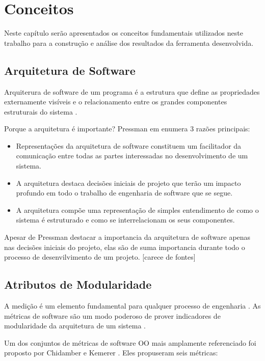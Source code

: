 \chapter{Conceitos} \label{ch:conceitos}

Neste capítulo serão apresentados os conceitos fundamentais utilizados neste
trabalho para a construção e análise dos resultados da ferramenta desenvolvida.

\section{Arquitetura de Software}

Arquiterura de software de um programa é a estrutura que define as propriedades
externamente visíveis e o relacionamento entre os grandes componentes
estruturais do sistema \cite{engenhariaDeSoftwarePressman}.

Porque a arquitetura é importante? Pressman em
\cite{engenhariaDeSoftwarePressman} enumera 3 razões principais:

\begin{itemize}
\item Representações da arquitetura de software constituem um facilitador da
comunicação entre todas as partes interessadas no desenvolvimento de um
sistema.
\item A arquitetura destaca decisões iniciais de projeto que terão um impacto
profundo em todo o trabalho de engenharia de software que se segue.
\item A arquitetura compõe uma representação de simples entendimento de como o
sistema é estruturado e como se interrelacionam os seus componentes.
\end{itemize}

Apesar de Pressman destacar a importancia da arquitetura de software apenas nas
decisões iniciais do projeto, elas são de suma importancia durante todo o
processo de desenvilvimento de um projeto. [carece de fontes]

\section{Atributos de Modularidade}

A medição é um elemento fundamental para qualquer processo de engenharia \cite{engenhariaDeSoftwarePressman}. As métricas de software são um modo poderoso de prover indicadores de modularidade da arquitetura de um sistema \cite{OntheModular}.

Um dos conjuntos de métricas de software OO mais amplamente referenciado foi proposto por Chidamber e Kemerer \cite{engenhariaDeSoftwarePressman}. Eles propuseram seis métricas:

